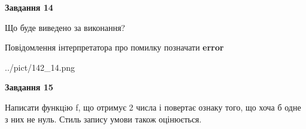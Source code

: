 \documentclass[11pt, ukrainian]{article}
\begin{document}
{\begin {large}
{\begin {center}\textbf{Завдання 14}\end {center}}\par
Що буде виведено за виконання? \par
Повідомлення інтерпретатора про помилку позначати \textbf{error}

\begin{center}
	{../pict/142_14.png}
\end{center}
\newpage

{\begin {center}\textbf{Завдання 15}\end {center}}\par

Написати функцiю f, що отримує 2 числа і повертає ознаку того, що хоча б одне з них не нуль. Стиль запису умови також оцінюється.\par
\newpage

\end {large}}
\end{document}
